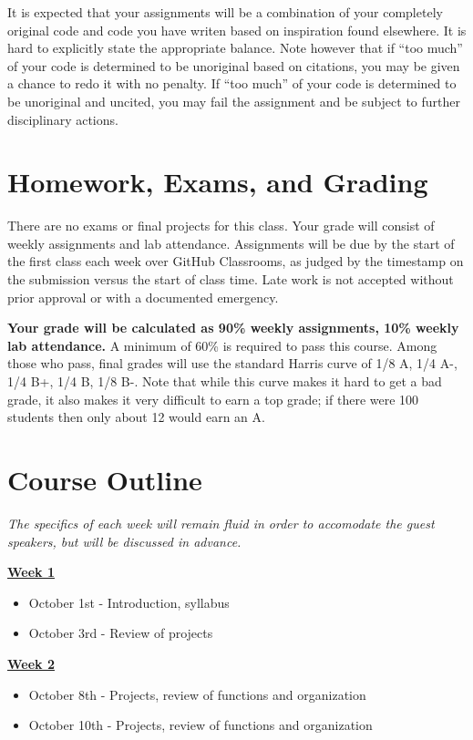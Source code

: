 \documentclass{article}
\begin{document}
It is expected that your assignments will be a combination of your completely original code and code you have writen based on inspiration found elsewhere.  It is hard to explicitly state the appropriate balance.  Note however that if ``too much'' of your code is determined to be unoriginal based on citations, you may be given a chance to redo it with no penalty.  If ``too much'' of your code is determined to be unoriginal and uncited, you may fail the assignment and be subject to further disciplinary actions.

\section*{Homework, Exams, and Grading}
There are no exams or final projects for this class.  Your grade will consist of weekly assignments and lab attendance.  Assignments will be due by the start of the first class each week over GitHub Classrooms, as judged by the timestamp on the submission versus the start of class time.  Late work is not accepted without prior approval or with a documented emergency.

\textbf{Your grade will be calculated as 90\% weekly assignments, 10\% weekly lab attendance.}  A minimum of 60\% is required to pass this course.  Among those who pass, final grades will use the standard Harris curve of 1/8 A, 1/4 A-, 1/4 B+, 1/4 B, 1/8 B-.  Note that while this curve makes it hard to get a bad grade, it also makes it very difficult to earn a top grade; if there were 100 students then only about 12 would earn an A.



\section*{Course Outline}

\textit{The specifics of each week will remain fluid in order to accomodate the guest speakers, but will be discussed in advance.}\\
\smallskip

\noindent
\textbf{\underline{Week 1}}
\begin{itemize}
\item October 1st - Introduction, syllabus
\item October 3rd - Review of projects
\end{itemize}
\bigskip

\noindent
\textbf{\underline{Week 2}}
\begin{itemize}
\item October 8th - Projects, review of functions and organization
\item October 10th - Projects, review of functions and organization
\end{itemize}
\bigskip
\end{document}
